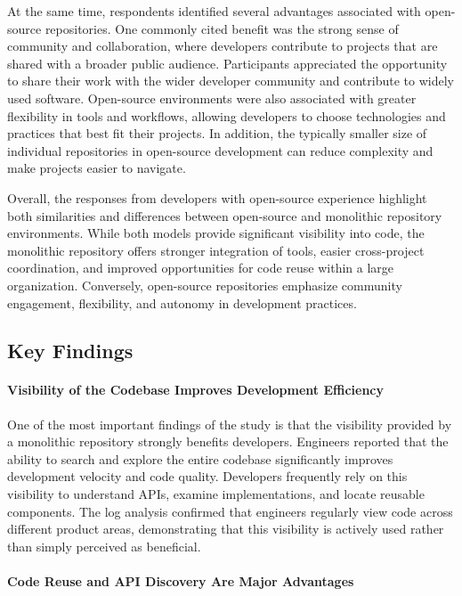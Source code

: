 At the same time, respondents identified several advantages associated with open-source repositories. One commonly cited benefit was the strong sense of community and collaboration, where developers contribute to projects that are shared with a broader public audience. Participants appreciated the opportunity to share their work with the wider developer community and contribute to widely used software. Open-source environments were also associated with greater flexibility in tools and workflows, allowing developers to choose technologies and practices that best fit their projects. In addition, the typically smaller size of individual repositories in open-source development can reduce complexity and make projects easier to navigate.

Overall, the responses from developers with open-source experience highlight both similarities and differences between open-source and monolithic repository environments. While both models provide significant visibility into code, the monolithic repository offers stronger integration of tools, easier cross-project coordination, and improved opportunities for code reuse within a large organization. Conversely, open-source repositories emphasize community engagement, flexibility, and autonomy in development practices.

\subsection{Key Findings}
\paragraph{Visibility of the Codebase Improves Development Efficiency}

One of the most important findings of the study is that the visibility provided by a monolithic repository strongly benefits developers. Engineers reported that the ability to search and explore the entire codebase significantly improves development velocity and code quality. Developers frequently rely on this visibility to understand APIs, examine implementations, and locate reusable components. The log analysis confirmed that engineers regularly view code across different product areas, demonstrating that this visibility is actively used rather than simply perceived as beneficial.

\paragraph{Code Reuse and API Discovery Are Major Advantages}

